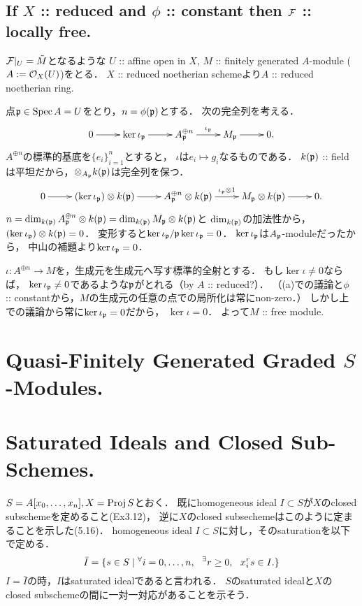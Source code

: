 \documentclass[a4paper]{jsarticle}
\begin{document}
    \subsection{If $X$ :: reduced and $\phi$ :: constant then $\mathcal{F}$ :: locally free.}
    $\mathcal{F}|_U=\tilde{M}$となるような
    $U$ :: affine open in $X$, 
    $M$ :: finitely generated $A$-module ($A:=\mathcal{O}_X(U)$)をとる．
    $X$ :: reduced noetherian schemeより$A$ :: reduced noetherian ring.
    
    点$\mathfrak{p} \in \operatorname{Spec} A=U$をとり，$n=\phi(\mathfrak{p})$とする．
    次の完全列を考える．
    \[
        \xymatrix
        {
            0 \ar[r]& \ker \iota_{\I{p}} \ar[r]& A_{\I{p}}^{\oplus n} \ar[r]^-{\iota_{\I{p}}}& M_{\I{p}} \ar[r]& 0.
        }
    \]
    $A^{\oplus n}$の標準的基底を$\{e_i\}_{i=1}^n$とすると，
    $\iota$は$e_i \mapsto g_i$なるものである．
    $k(\mathfrak{p})$ :: fieldは平坦だから，$\otimes_{A_{\mathfrak{p}}} k(\mathfrak{p})$は完全列を保つ．
    \[
        \xymatrix
        {
            0 \ar[r]
            & (\ker \iota_{\I{p}}) \otimes k(\I{p}) \ar[r]
            & A_{\I{p}}^{\oplus n}\otimes k(\I{p}) \ar[r]^-{\iota_{\I{p}} \otimes 1}
            & M_{\I{p}} \otimes k(\I{p}) \ar[r]& 0.
        }
    \]
    $n=\dim_{k(\mathfrak{p})} A_{\mathfrak{p}}^{\oplus n}\otimes k(\mathfrak{p})=\dim_{k(\mathfrak{p})} M_{\mathfrak{p}} \otimes k(\mathfrak{p})$と
    $\dim_{k(\mathfrak{p})}$の加法性から，
    $(\ker \iota_{\mathfrak{p}}) \otimes k(\mathfrak{p})=0$．
    変形すると$\ker \iota_{\mathfrak{p}}/\mathfrak{p}\ker \iota_{\mathfrak{p}}=0$．
    $\ker \iota_{\mathfrak{p}}$は$A_{\mathfrak{p}}$-moduleだったから，
    中山の補題より$\ker \iota_{\mathfrak{p}}=0$．

    $\iota: A^{\oplus n} \to M$を，生成元を生成元へ写す標準的全射とする．
    もし$\ker \iota \neq 0$ならば，
    $\ker \iota_{\mathfrak{p}} \neq 0$であるような$\mathfrak{p}$がとれる（by $A$ :: reduced?）．
    （(a)での議論と$\phi$ :: constantから，$M$の生成元の任意の点での局所化は常にnon-zero．）
    しかし上での議論から常に$\ker \iota_{\mathfrak{p}}=0$だから，
    $\ker \iota=0$．
    よって$M$ :: free module.

\section{Quasi-Finitely Generated Graded $S$-Modules.} %

\section{Saturated Ideals and Closed Sub-Schemes.} %
    $S=A[x_0,\dots,x_n], X=\operatorname{Proj} S$とおく．
    既にhomogeneous ideal $I \subset S$が$X$のclosed subschemeを定めること(Ex3.12)，
    逆に$X$のclosed subsechemeはこのように定まることを示した(5.16)．
    homogeneous ideal $I \subset S$に対し，そのsaturationを以下で定める．
    \[ \bar{I}=\{s \in S \mid {}^{\forall} i=0,\dots,n,~~ {}^{\exists} r \geq 0,~~ x_i^r s \in I. \} \]
    $I=\bar{I}$の時，$I$はsaturated idealであると言われる．
    $S$のsaturated idealと$X$のclosed subschemeの間に一対一対応があることを示そう．
\end{document}
